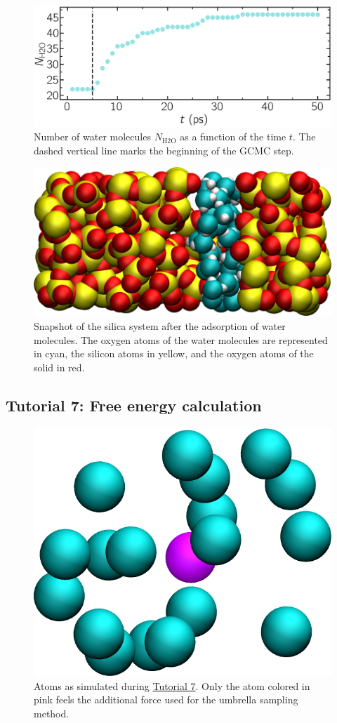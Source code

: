 \documentclass[9pt,tutorial]{livecoms}
\begin{document}
\begin{figure}
\centering
\includegraphics[width=\linewidth]{GCMC-number}
\caption{Number of water molecules $N_\text{H2O}$ as a function of the time $t$. The dashed vertical line marks the beginning of the GCMC step.}
\label{fig:GCMC-number}
\end{figure}

\begin{figure}
\centering
\includegraphics[width=\linewidth]{GCMC-solvated}
\caption{Snapshot of the silica system after the adsorption of water molecules. The oxygen atoms of the water molecules are represented in cyan, the silicon atoms in yellow, and the oxygen atoms of the solid in red.}
\label{fig:GCMC-solvated}
\end{figure}

\subsection{Tutorial 7: Free energy calculation}
\label{umbrella-sampling-label}

\begin{figure}
\centering
\includegraphics[width=0.55\linewidth]{US}
\caption{Atoms as simulated during \hyperref[umbrella-sampling-label]{Tutorial 7}. Only the atom colored in pink feels the additional force used for the umbrella sampling method.}
\label{fig:US}
\end{figure}
\end{document}
